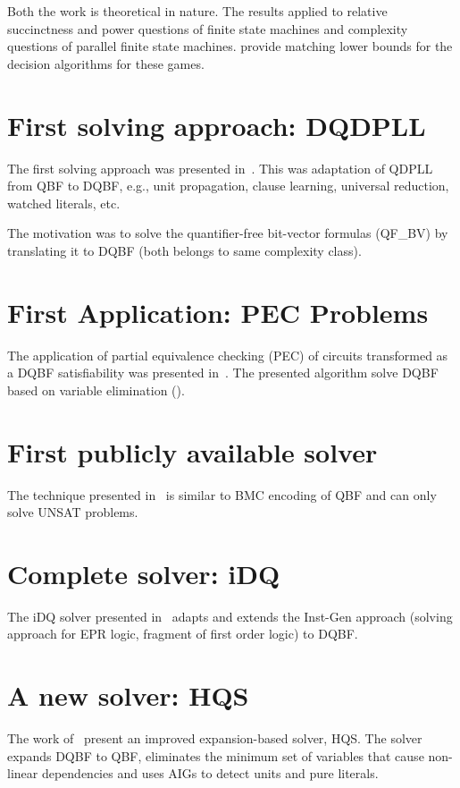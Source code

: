 \documentclass[runningheads]{llncs}
\begin{document}
Both the work \cite{petersonr79, peterson2001lower} is theoretical in nature. The results applied to relative succinctness and power questions of finite state machines and complexity questions of parallel finite state machines.
\cite{peterson2001lower} provide matching lower bounds for the decision algorithms for these games.

\section{First solving approach: DQDPLL}
The first solving approach was presented in~\cite{frohlich2012dpll}.
%
This was adaptation of QDPLL from QBF to DQBF, e.g., unit propagation, clause
learning, universal reduction, watched literals, etc.
%

The motivation was to solve the quantifier-free bit-vector formulas (QF\_BV) by translating it to DQBF (both belongs to same complexity class).

\section{First Application: PEC Problems}
The application of partial equivalence checking (PEC) of circuits transformed as a DQBF satisfiability was presented in~\cite{gitina2013equivalence}.
%
The presented algorithm solve DQBF based on variable elimination (\cite{biere2004resolve}).

\section{First publicly available solver}
The technique presented in~\cite{finkbeiner2014fast} is similar to BMC encoding of QBF and can only solve UNSAT problems.  

\section{Complete solver: iDQ}
The iDQ solver presented in~\cite{frohlich2014idq} adapts and extends the Inst-Gen approach (solving approach for EPR logic, fragment of first order logic) to DQBF.

\section{A new solver: HQS}
The work of~\cite{gitina2015solving} present an improved expansion-based solver, HQS.
%
The solver expands DQBF to QBF, eliminates the minimum set of variables that cause non-linear
dependencies and uses AIGs to detect units and pure literals.
\end{document}
